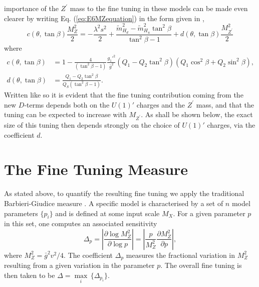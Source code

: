 \documentclass[preprint,amsmath,amssymb,aps,superscriptaddress,prd,showpacs,floatfix,nofootinbib]{revtex4-1}
\begin{document}
importance of the $Z^\prime$ mass to the fine tuning in these models
can be made even clearer by writing Eq. (\ref{eq:E6MZequation}) in the
form given in \cite{Athron:2013ipa},
\begin{equation}\label{eq:originalE6MZequation}
c(\theta,\tan\beta)\frac{M_Z^2}{2}=-\frac{\lambda^2 s^2}{2}+\frac{\tilde{m}_{H_d}^2-\tilde{m}_{H_u}^2\tan^2\beta}{\tan^2\beta-1}+d(\theta,\tan\beta)\frac{M_{Z^\prime}^2}{2}
\end{equation}
where 
\begin{align}
c(\theta,\tan\beta)&=1-\frac{4}{\left ( \tan^2\beta-1\right )}\frac{g_1'^2}{\bar{g}^2}\left ( Q_1-Q_2\tan^2\beta \right )\left ( Q_1\cos^2\beta+Q_2\sin^2\beta \right ),\label{eq:cdefn}\\
d(\theta,\tan\beta)&= \frac{Q_1-Q_2\tan^2\beta}{Q_S\left ( \tan^2\beta - 1\right )}.\label{eq:ddefn}
\end{align}
Written like so it is evident that the fine tuning contribution coming
from the new $D$-terms depends both on the $U(1)'$ charges and the
$Z^\prime$ mass, and that the tuning can be expected to increase with
$M_{Z^\prime}$. As shall be shown below, the exact size of this tuning
then depends strongly on the choice of $U(1)'$ charges, via the
coefficient $d$.
\section{\label{sec:tuningmeasure}The Fine Tuning Measure}
As stated above, to quantify the resulting fine tuning we
apply the traditional Barbieri-Giudice measure
\cite{Ellis:1986yg,Barbieri:1987fn}. A specific model is characterised
by a set of $n$ model parameters $\{p_i\}$ and is defined at some
input scale $M_X$. For a given parameter $p$ in this set, one computes
an associated sensitivity
\begin{equation}\label{eq:bgmeasure}
\Delta_p=\left | \frac{\partial \log M_Z^2}{\partial \log p}\right
|=\left | \frac{p}{M_Z^2}\frac{\partial M_Z^2}{\partial p}\right |,
\end{equation}
where $M_Z^2=\bar{g}^2v^2/4$. The coefficient $\Delta_p$ measures the
fractional variation in $M_Z^2$ resulting from a given variation in
the parameter $p$. The overall fine tuning is then taken to be $\Delta
= \underset{i}{\max}\,\{\Delta_{p_i}\}$.\\
\end{document}
